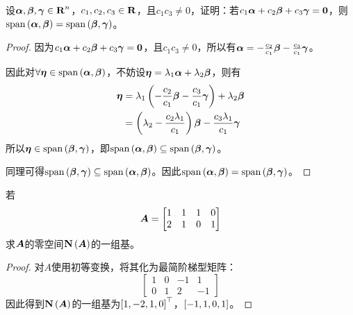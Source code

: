 \begin{problem}
设\(\vecal,\vecbeta,\vecgamma\in\rea^n\)，\(c_1,c_2,c_3\in\rea\)，且\(c_1c_3\neq0\)，证明：若\(c_1\vecal+c_2\vecbeta+c_3\vecgamma=\veczero\)，则\(\myspan{\vecal,\vecbeta}=\myspan{\vecbeta,\vecgamma}\)。
\end{problem}
\begin{proof}
    因为\(c_1\vecal+c_2\vecbeta+c_3\vecgamma=\veczero\)，且\(c_1c_3\neq0\)，所以有\(\vecal=-\frac{c_2}{c_1}\vecbeta-\frac{c_3}{c_1}\vecgamma\)。

    因此对\(\forall\veceta\in\myspan{\vecal,\vecbeta}\)，不妨设\(\veceta=\lambda_1\vecal+\lambda_2\vecbeta\)，则有
    \begin{align*}
        \veceta & =\lambda_1\mypar{-\frac{c_2}{c_1}\vecbeta-\frac{c_3}{c_1}\vecgamma}+\lambda_2\vecbeta \\
                & =\mypar{\lambda_2-\frac{c_2\lambda_1}{c_1}}\vecbeta-\frac{c_3\lambda_1}{c_1}\vecgamma
    \end{align*}
    所以\(\veceta\in\myspan{\vecbeta,\vecgamma}\)，即\(\myspan{\vecal,\vecbeta}\subseteq\myspan{\vecbeta,\vecgamma}\)。

    同理可得\(\myspan{\vecbeta,\vecgamma}\subseteq\myspan{\vecal,\vecbeta}\)。因此\(\myspan{\vecal,\vecbeta}=\myspan{\vecbeta,\vecgamma}\)。
\end{proof}

\begin{problem}
若
\begin{equation*}
    \mata=\begin{bmatrix}1&1&1&0\\2&1&0&1\end{bmatrix}
\end{equation*}
求\(\mata\)的零空间\(\nullsp{\mata}\)的一组基。
\end{problem}
\begin{proof}
    对\(A\)使用初等变换，将其化为最简阶梯型矩阵：
    \begin{equation*}
        \begin{bmatrix}
            1 & 0 & -1 & 1  \\
            0 & 1 & 2  & -1
        \end{bmatrix}
    \end{equation*}
    因此得到\(\nullsp{\mata}\)的一组基为\(\myvec{1,-2,1,0}\)，\(\mat{-1,1,0,1}\)。
\end{proof}

